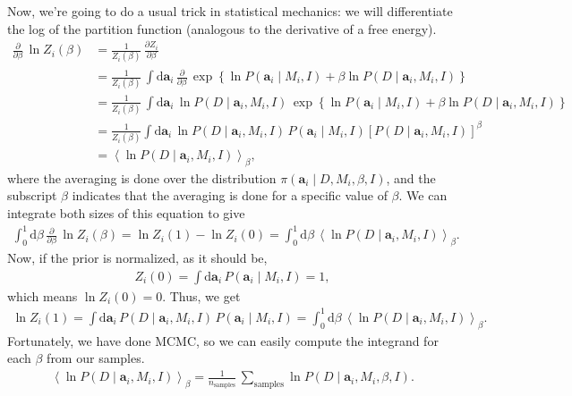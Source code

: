 Now, we're going to do a usual trick in statistical mechanics: we will
differentiate the log of the partition function (analogous to the
derivative of a free energy).
\begin{align}
\frac{\partial}{\partial \beta} \,\ln Z_i(\beta) &=
\frac{1}{Z_i(\beta)}\,\frac{\partial Z_i}{\partial \beta} \nonumber \\
&= \frac{1}{Z_i(\beta)}\,\int \mathrm{d}\mathbf{a}_i\,
\frac{\partial}{\partial\beta}\,
\exp\left\{\ln P(\mathbf{a}_i\mid M_i, I) + \beta \ln P(D\mid \mathbf{a}_i, M_i, I)\right\} \nonumber \\
&= \frac{1}{Z_i(\beta)}\,\int \mathrm{d}\mathbf{a}_i\, \ln P(D\mid \mathbf{a}_i, M_i, I)\,
\exp\left\{\ln P(\mathbf{a}_i\mid M_i, I) + \beta \ln P(D\mid \mathbf{a}_i, M_i, I)\right\} \nonumber \\
&= \frac{1}{Z_i(\beta)}\int\mathrm{d}\mathbf{a}_i\,\ln P(D\mid \mathbf{a}_i, M_i, I)\,P(\mathbf{a}_i\mid M_i, I)\left[P(D\mid \mathbf{a}_i, M_i, I)\right]^\beta \nonumber \\
&= \left\langle \ln P(D\mid \mathbf{a}_i, M_i, I)\right\rangle_\beta,
\end{align}
where the averaging is done over the distribution
$\pi(\mathbf{a}_i\mid D, M_i, \beta, I)$, and the subscript $\beta$
indicates that the averaging is done for a specific value of $\beta$.
We can integrate both sizes of this equation to give
\begin{align}
\int_0^1 \mathrm{d}\beta\, \frac{\partial}{\partial \beta} \,\ln Z_i(\beta)
= \ln Z_i(1) - \ln Z_i(0) = \int_0^1\mathrm{d}\beta\,\left\langle \ln P(D\mid \mathbf{a}_i, M_i, I)\right\rangle_\beta.
\end{align}
Now, if the prior is normalized, as it should be,
\begin{align}
Z_i(0) = \int \mathrm{d}\mathbf{a}_i\,P(\mathbf{a}_i\mid M_i, I) = 1,
\end{align}
which means $\ln Z_i(0) = 0$.  Thus, we get
\begin{align}
\ln Z_i(1) =
\int \mathrm{d}\mathbf{a}_i\,P(D\mid \mathbf{a}_i, M_i, I)\,
P(\mathbf{a}_i\mid M_i, I)
=
\int_0^1\mathrm{d}\beta\,\left\langle \ln P(D\mid \mathbf{a}_i, M_i, I)\right\rangle_\beta.
\end{align}
Fortunately, we have done MCMC, so we can easily compute the integrand
for each $\beta$ from our samples.
\begin{align}
\left\langle \ln P(D\mid \mathbf{a}_i, M_i, I)\right\rangle_\beta
= \frac{1}{n_\text{samples}}\,\sum_\text{samples} \ln P(D\mid \mathbf{a}_i, M_i, \beta, I).
\label{eq:ptmcmc_average}
\end{align}
